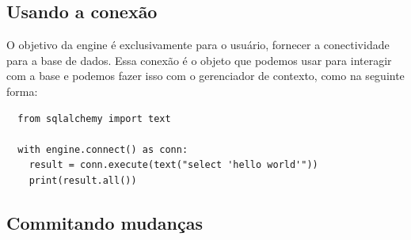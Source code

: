 \documentclass[12pt, a4paper]{paper}
\begin{document}
\subsection{Usando a conexão} %
\label{sub:Usando a conexão}
O objetivo da engine  é exclusivamente para o usuário, fornecer a conectividade para 
a base de dados. Essa conexão é o objeto que podemos usar para interagir com a base e podemos fazer isso com o gerenciador de contexto, como na seguinte forma:

\begin{verbatim}
  from sqlalchemy import text 

  with engine.connect() as conn:
    result = conn.execute(text("select 'hello world'"))
    print(result.all())
\end{verbatim}

\subsection{Commitando mudanças} %
\label{sub:Commitando mudanças}









\end{document}
